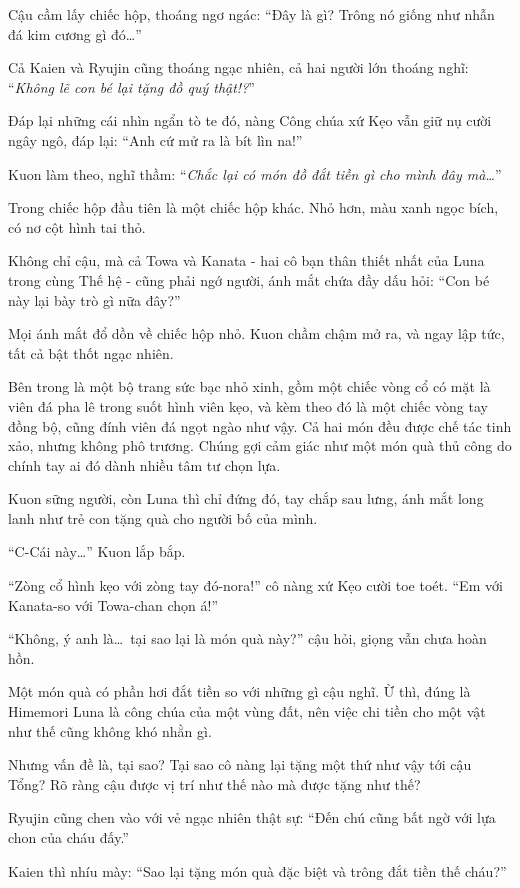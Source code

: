 \documentclass[../main.tex]{subfiles}
\begin{document}
Cậu cầm lấy chiếc hộp, thoáng ngơ ngác: ``Đây là gì? Trông nó giống như nhẫn đá kim cương gì đó\dots''

Cả Kaien và Ryujin cũng thoáng ngạc nhiên, cả hai người lớn thoáng nghĩ: ``\textit{Không lẽ con bé lại tặng đồ quý thật!?}''

Đáp lại những cái nhìn ngẩn tò te đó, nàng Công chúa xứ Kẹo vẫn giữ nụ cười ngây ngô, đáp lại: ``Anh cứ mử ra là bít lìn na!''

Kuon làm theo, nghĩ thầm: ``\textit{Chắc lại có món đồ đắt tiền gì cho mình đây mà\dots}''

Trong chiếc hộp đầu tiên là một chiếc hộp khác. Nhỏ hơn, màu xanh ngọc bích, có nơ cột hình tai thỏ.

Không chỉ cậu, mà cả Towa và Kanata - hai cô bạn thân thiết nhất của Luna trong cùng Thế hệ - cũng phải ngớ người, ánh mắt chứa đầy dấu hỏi: ``Con bé này lại bày trò gì nữa đây?''

Mọi ánh mắt đổ dồn về chiếc hộp nhỏ. Kuon chầm chậm mở ra, và ngay lập tức, tất cả bật thốt ngạc nhiên.

Bên trong là một bộ trang sức bạc nhỏ xinh, gồm một chiếc vòng cổ có mặt là viên đá pha lê trong suốt hình viên kẹo, và kèm theo đó là một chiếc vòng tay đồng bộ, cũng đính viên đá ngọt ngào như vậy. Cả hai món đều được chế tác tinh xảo, nhưng không phô trương. Chúng gợi cảm giác như một món quà thủ công do chính tay ai đó dành nhiều tâm tư chọn lựa.

Kuon sững người, còn Luna thì chỉ đứng đó, tay chắp sau lưng, ánh mắt long lanh như trẻ con tặng quà cho người bố của mình.

``C-Cái này\dots'' Kuon lắp bắp.

``Zòng cổ hình kẹo với zòng tay đó-nora!'' cô nàng xứ Kẹo cười toe toét. ``Em với Kanata-so với Towa-chan chọn á!''

``Không, ý anh là\dots\ tại sao lại là món quà này?'' cậu hỏi, giọng vẫn chưa hoàn hồn.

Một món quà có phần hơi đắt tiền so với những gì cậu nghĩ. Ừ thì, đúng là Himemori Luna là công chúa của một vùng đất, nên việc chi tiền cho một vật như thế cũng không khó nhằn gì.

Nhưng vấn đề là, tại sao? Tại sao cô nàng lại tặng một thứ như vậy tới cậu Tổng? Rõ ràng cậu được vị trí như thế nào mà được tặng như thế?

Ryujin cũng chen vào với vẻ ngạc nhiên thật sự: ``Đến chú cũng bất ngờ với lựa chon của cháu đấy.''

Kaien thì nhíu mày: ``Sao lại tặng món quà đặc biệt và trông đắt tiền thế cháu?''
\end{document}
